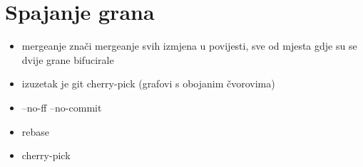\chapter*{Spajanje grana}

\begin{itemize}
   \item mergeanje znači mergeanje svih izmjena u povijesti, sve od mjesta gdje su se dvije grane bifucirale
   \item izuzetak je git cherry-pick (grafovi s obojanim čvorovima)
   \item --no-ff --no-commit
   \item rebase
   \item cherry-pick
\end{itemize}


